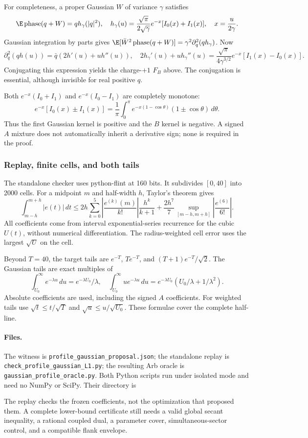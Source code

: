For completeness, a proper Gaussian $W$ of variance $\gamma$ satisfies
\[
 \E\ph(q+W)=qh_\gamma(|q|^2),\quad
 h_\gamma(u)=\frac{\sqrt\pi}{2\sqrt\gamma}
 e^{-x}[I_0(x)+I_1(x)],\quad x=\frac{u}{2\gamma}.
\]
Gaussian integration by parts gives
$\E[\bar W^2\ph(q+W)]=\gamma^2\partial_q^2(qh_\gamma)$.
Now
\[
 \partial_q^2(qh(u))=\bar q(2h'(u)+uh''(u)),\quad
 2h_\gamma'(u)+uh_\gamma''(u)
 =\frac{\sqrt\pi}{4\gamma^{3/2}}e^{-x}[I_1(x)-I_0(x)].
\]
Conjugating this expression yields the charge-$+1$ $F_B$ above.
The conjugation is essential, although invisible for real positive $q$.

Both $e^{-x}(I_0+I_1)$ and $e^{-x}(I_0-I_1)$ are completely monotone:
\[
 e^{-x}[I_0(x)\pm I_1(x)]
 =\frac1\pi\int_0^\pi e^{-x(1-\cos\theta)}
                         (1\pm\cos\theta)\,d\theta.
\]
Thus the first Gaussian kernel is positive and the $B$ kernel is
negative. A signed $A$ mixture does not automatically inherit a
derivative sign; none is required in the proof.

\subsubsection{Replay, finite cells, and both tails}
The standalone checker uses python-flint at 160 bits. It subdivides
$[0,40]$ into 2000 cells. For a midpoint $m$ and half-width $h$,
Taylor's theorem gives
\[
 \int_{m-h}^{m+h}|e(t)|\,dt\le
 2h\sum_{k=0}^5\left|\frac{e^{(k)}(m)}{k!}\right|
                  \frac{h^k}{k+1}
 +\frac{2h^7}7\sup_{[m-h,m+h]}
                         \left|\frac{e^{(6)}}{6!}\right|.
\]
All coefficients come from interval exponential-series recurrence for
the cubic $U(t)$, without numerical differentiation. The radius-weighted
cell error uses the largest $\sqrt U$ on the cell.

Beyond $T=40$, the target tails are $e^{-T}$, $Te^{-T}$,
and $(T+1)e^{-T}/\sqrt2$. The Gaussian tails are exact multiples of
\[
 \int_{U_0}^\infty e^{-\lambda u}\,du
  =e^{-\lambda U_0}/\lambda,\quad
 \int_{U_0}^\infty ue^{-\lambda u}\,du
  =e^{-\lambda U_0}(U_0/\lambda+1/\lambda^2).
\]
Absolute coefficients are used, including the signed $A$ coefficients.
For weighted tails use $\sqrt t\le t/\sqrt T$ and
$\sqrt u\le u/\sqrt{U_0}$. These formulae cover the complete half-line.

\paragraph{Files.}
The witness is \texttt{profile\_gaussian\_proposal.json}; the standalone
replay is \texttt{check\_profile\_gaussian\_L1.py}; the resulting
Arb oracle is \texttt{gaussian\_profile\_oracle.py}. Both Python scripts
run under isolated mode and need no NumPy or SciPy. Their directory is
\begin{quote}\small{}\end{quote}
The replay checks the frozen coefficients, not the optimization that
proposed them. A complete lower-bound certificate still needs a valid
global secant inequality, a rational coupled dual, a parameter cover,
simultaneous-sector control, and a compatible flank envelope.



